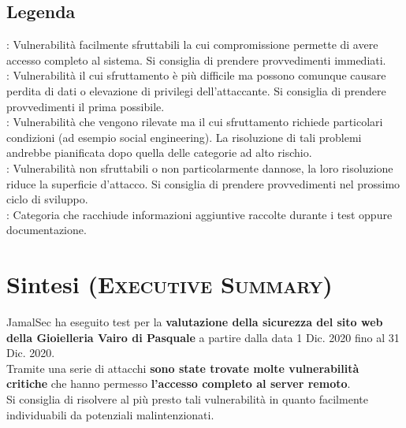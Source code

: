 \begin{cvletter}
\begin{minipage}[t]{0.33\textwidth}
      \footnotesize
      \subsection{Legenda}
      \textsc{}: Vulnerabilità facilmente sfruttabili la cui compromissione permette di avere accesso completo
      al sistema. Si consiglia di prendere provvedimenti immediati.\\

      \textsc{}: Vulnerabilità il cui sfruttamento è più difficile ma possono comunque causare
      perdita di dati o elevazione di privilegi dell'attaccante. Si consiglia di prendere provvedimenti il prima possibile.\\

      \textsc{}: Vulnerabilità che vengono rilevate ma il cui sfruttamento richiede particolari
      condizioni (ad esempio social engineering). La risoluzione di tali problemi andrebbe pianificata dopo quella delle categorie
      ad alto rischio.\\

      \textsc{}: Vulnerabilità non sfruttabili o non particolarmente dannose, la loro
      risoluzione riduce la superficie d'attacco. Si consiglia di prendere provvedimenti nel prossimo ciclo di sviluppo.\\

      \textsc{}: Categoria che racchiude informazioni aggiuntive raccolte durante i test
      oppure documentazione.\\
      \sectionsep


   \end{minipage} 
   \hfill
   \begin{minipage}[t]{0.60\textwidth} 


      \section{\color{awesome-red}Sin\color{darktext}tesi (\textsc{Executive Summary})\ \color{gray}\vhrulefill{0.9pt}}
      JamalSec ha eseguito test per la \textbf{valutazione della sicurezza del sito web della Gioielleria Vairo di Pasquale} a
      partire dalla data 1 Dic. 2020 fino al 31 Dic. 2020.\\
      Tramite una serie di attacchi \textbf{sono state trovate molte vulnerabilità critiche} che hanno permesso \textbf{l'accesso
      completo al server remoto}.\\
      Si consiglia di risolvere al più presto tali vulnerabilità in quanto facilmente individuabili da potenziali
      malintenzionati.


\end{minipage}
\end{cvletter}
